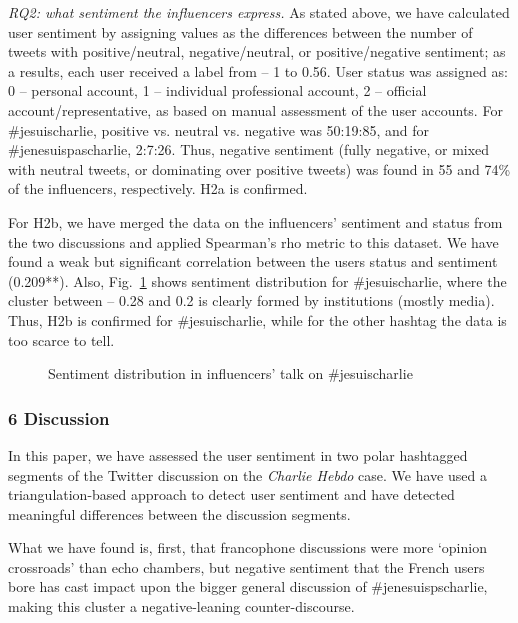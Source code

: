 \textit{RQ2: what sentiment the influencers express.} As stated above, we have calculated user sentiment by assigning values as the differences between the number of tweets with positive/neutral, negative/neutral, or positive/negative sentiment; as a results, each user received a label from -- 1 to 0.56. User status was assigned as: 0 -- personal account, 1 -- individual professional account, 2 -- official account/representative, as based on manual assessment of the user accounts. For \#jesuischarlie, positive vs. neutral vs. negative was 50:19:85, and for \#jenesuispascharlie, 2:7:26. Thus, negative sentiment (fully negative, or mixed with neutral tweets, or dominating over positive tweets) was found in 55 and 74\% of the influencers, respectively. H2a is confirmed.

For H2b, we have merged the data on the influencers’ sentiment and status from the two discussions and applied Spearman’s rho metric to this dataset. We have found a weak but significant correlation between the users status and sentiment (0.209**). Also, Fig.~\cref{fig:jesuischarlieSentimentDistribution} shows sentiment distribution for \#jesuischarlie, where the cluster between -- 0.28 and 0.2 is clearly formed by institutions (mostly media). Thus, H2b is confirmed for \#jesuischarlie, while for the other hashtag the data is too scarce to tell.

\begin{figure}[ht]
	\caption{Sentiment distribution in influencers’ talk on \#jesuischarlie}\label{fig:jesuischarlieSentimentDistribution}
\end{figure}

\subsubsection{6 Discussion}

In this paper, we have assessed the user sentiment in two polar hashtagged segments of the Twitter discussion on the \textit{Charlie Hebdo} case. We have used a triangulation-based approach to detect user sentiment and have detected meaningful differences between the discussion segments.

What we have found is, first, that francophone discussions were more ‘opinion crossroads’ than echo chambers, but negative sentiment that the French users bore has cast impact upon the bigger general discussion of \#jenesuispscharlie, making this cluster a negative-leaning counter-discourse.

